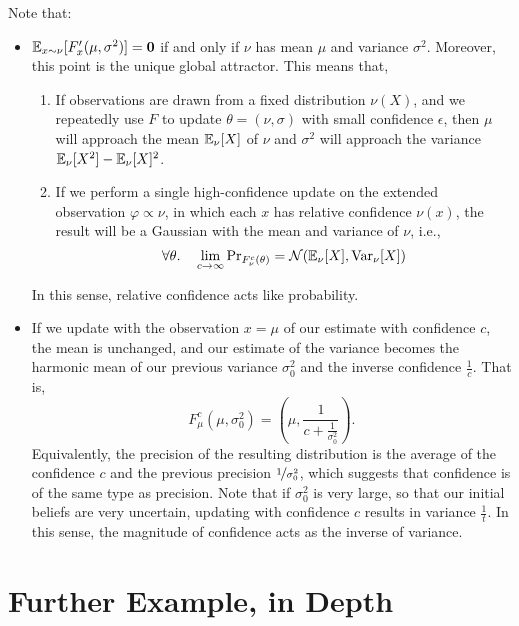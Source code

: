 \documentclass{uai2023}
\theoremstyle{plain}
\theoremstyle{definition}
\newcommand{\mat}[1]{\mathbf{#1}}
\begin{document}
\begin{example}
	Note that:
	\begin{itemize}
		\item  $\Ex_{x \sim \nu} [ F'_x(\mu,\sigma^2) ] = \mat 0$ if and only if $\nu$ has mean $\mu$ and variance $\sigma^2$.
Moreover, this point is the unique global attractor.
		This means that,
		\begin{enumerate}
			\item If observations are drawn from a fixed distribution $\nu(X)$, and we repeatedly use $F$ to update $\theta = (\nu, \sigma)$ with small confidence $\epsilon$,
			then $\mu$ will approach the mean $\operatorname*{\mathbb{E}}_{\nu}[X]$ of $\nu$
			and $\sigma^2$ will approach the variance $\operatorname*{\mathbb{E}}_{\nu}[X^2] - \operatorname*{\mathbb{E}}_{\nu}[X]^2$.


			\item If we perform a single high-confidence update on the extended observation $\varphi \propto \nu$, in which each $x$ has relative confidence $\nu(x)$, the result will be a Gaussian with the mean and variance of $\nu$, i.e.,
			\[
				\forall \theta.\quad
				\lim_{c \to \infty} \Pr\nolimits_{F_{\nu}^c(\theta)} = \mathcal N(\operatorname*{\mathbb{E}}\nolimits_{\nu}[X], {\mathrm{Var}}_{\nu}[X])
			\]
		\end{enumerate}
		In this sense, relative confidence acts like probability.


		\item
		If we update with the observation $x = \mu$ of our estimate with confidence $c$,
		the mean is unchanged, and our estimate of the variance becomes the harmonic mean of our previous variance $\sigma_0^2$ and the inverse confidence $\frac1c$.
		That is,
		\[
			F^c_\mu(\mu, \sigma_0^2) =
			\left(\mu, \frac{1}{c + \frac{1}{\sigma_0^2}} \right).
		\]
		Equivalently, the precision of the resulting distribution is the average of the confidence $c$ and the previous precision $\nicefrac{1}{\sigma_0^2}$, which suggests that confidence is of the same type as precision.
Note that if $\sigma_0^2$ is very large, so that our initial beliefs are very uncertain, updating with confidence $c$ results in variance $\frac1t$.
		In this sense, the magnitude of confidence acts as the inverse of variance.
	\end{itemize}
\end{example}
 
\section{Further Example, in Depth}
\end{document}
